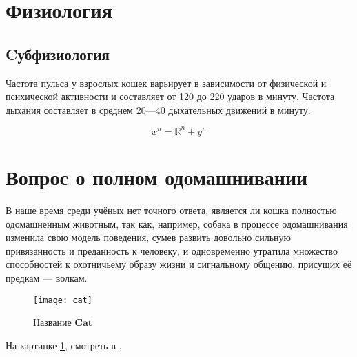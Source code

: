 \section{Физиология}
\subsection{Cубфизиология}

Частота пульса у взрослых кошек варьирует в зависимости от физической и психической активности и составляет от 120 до 220 ударов в минуту. Частота дыхания составляет в среднем 20—40 дыхательных движений в минуту.

\[x^n = \mathbb{R}^n + y^n\]

\section{Вопрос о полном одомашнивании}

В наше время среди учёных нет точного ответа, является ли кошка полностью одомашненным животным, так как, например, собака в процессе одомашнивания изменила свою модель поведения, сумев развить довольно сильную привязанность и преданность к человеку, и одновременно утратила множество способностей к охотничьему образу жизни и сигнальному общению, присущих её предкам — волкам.

\begin{figure}
	\centering
	\texttt{[image: cat]}
	\caption{Название $\mathbf{Cat}$}
	\label{fig:im1}
\end{figure}

На картинке \ref{fig:im1}, смотреть в \cite{betti}.